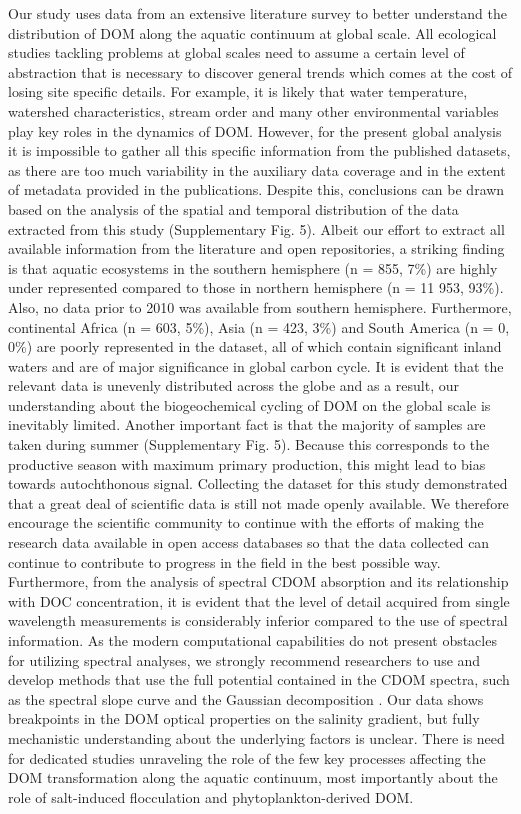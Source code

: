 Our study uses data from an extensive literature survey to better understand the distribution of DOM along the aquatic continuum at global scale. All ecological studies tackling problems at global scales need to assume a certain level of abstraction that is necessary to discover general trends which comes at the cost of losing site specific details. For example, it is likely that water temperature, watershed characteristics, stream order and many other environmental variables play key roles in the dynamics of DOM. However, for the present global analysis it is impossible to gather all this specific information from the published datasets, as there are too much variability in the auxiliary data coverage and in the extent of metadata provided in the publications. Despite this, conclusions can be drawn based on the analysis of the spatial and temporal distribution of the data extracted from this study (Supplementary Fig. 5). Albeit our effort to extract all available information from the literature and open repositories, a striking finding is that aquatic ecosystems in the southern hemisphere (n = 855, 7\%) are highly under represented compared to those in northern hemisphere (n = 11 953, 93\%). Also, no data prior to 2010 was available from southern hemisphere. Furthermore, continental Africa (n = 603, 5\%), Asia (n = 423, 3\%) and South America (n = 0, 0\%) are poorly represented in the dataset, all of which contain significant inland waters and are of major significance in global carbon cycle. It is evident that the relevant data is unevenly distributed across the globe and as a result, our understanding about the biogeochemical cycling of DOM on the global scale is inevitably limited. Another important fact is that the majority of samples are taken during summer (Supplementary Fig. 5). Because this corresponds to  the productive season with maximum primary production, this might lead to bias towards autochthonous signal. Collecting the dataset for this study demonstrated that a great deal of scientific data is still not made openly available. We therefore encourage the scientific community to continue with the efforts of making the research data available in open access databases so that the data collected can continue to contribute to progress in the field in the best possible way. Furthermore, from the analysis of spectral CDOM absorption and its relationship with DOC concentration, it is evident that the level of detail acquired from single wavelength measurements is considerably inferior compared to the use of spectral information. As the modern computational capabilities do not present obstacles for utilizing spectral analyses, we strongly recommend researchers to use and develop methods that use the full potential contained in the CDOM spectra, such as the spectral slope curve \citep{Loiselle2009} and the Gaussian decomposition \citep{Massicotte2016MC}. Our data shows breakpoints in the DOM optical properties on the salinity gradient, but fully mechanistic understanding about the underlying factors is unclear. There is need for dedicated studies unraveling the role of the few key processes affecting the DOM transformation along the aquatic continuum, most importantly about the role of salt-induced flocculation and phytoplankton-derived DOM.

